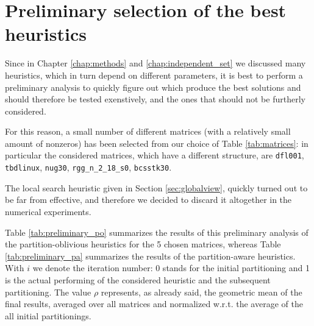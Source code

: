 \section{Preliminary selection of the best heuristics}

Since in Chapter \ref{chap:methods} and \ref{chap:independent_set} we discussed many heuristics, which in turn depend on different parameters, it is best to perform a preliminary analysis to quickly figure out which produce the best solutions and should therefore be tested exenstively, and the ones that should not be furtherly considered.

For this reason, a small number of different matrices (with a relatively small amount of nonzeros) has been selected from our choice of Table \ref{tab:matrices}: in particular the considered matrices, which have a different structure, are \verb|dfl001|, \verb|tbdlinux|, \verb|nug30|, \verb|rgg_n_2_18_s0|, \verb|bcsstk30|.

The local search heuristic given in Section \ref{sec:globalview}, quickly turned out to be far from effective, and therefore we decided to discard it altogether in the numerical experiments. 

Table \ref{tab:preliminary_po} summarizes the results of this preliminary analysis of the partition-oblivious heuristics for the 5 chosen matrices, whereas Table \ref{tab:preliminary_pa} summarizes the results of the partition-aware heuristics. With $i$ we denote the iteration number: 0 stands for the initial partitioning and 1 is the actual performing of the considered heuristic and the subsequent partitioning. The value $\rho$ represents, as already said, the geometric mean of the final results, averaged over all matrices and normalized w.r.t. the average of the all initial partitionings.

